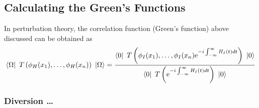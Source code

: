 \documentclass[11pt]{article}
\newcommand{\e}{\mathrm{e}}
\numberwithin{equation}{section}
\begin{document}
\subsection{Calculating the Green's Functions}
In perturbation theory, the correlation function (Green's function) above discussed can be obtained as 
\begin{equation}
    \bra{\Omega} ~T\left( \phi_H(x_1),\ldots,\phi_H(x_n)  \right)~ \ket{\Omega} = \frac{\bra{0} ~T\left( \phi_I(x_1),\ldots,\phi_I(x_n)  \e^{-i\int_{-\infty}^{\infty}H_I(t)dt}\right)~ \ket{0} }{\bra{0}~T\left( \e^{-i\int_{-\infty}^{\infty}H_I(t)dt}\right)~\ket{0}}
    \label{eq:correlation_fun}
\end{equation}

\subsubsection{Diversion \ldots}
\end{document}
